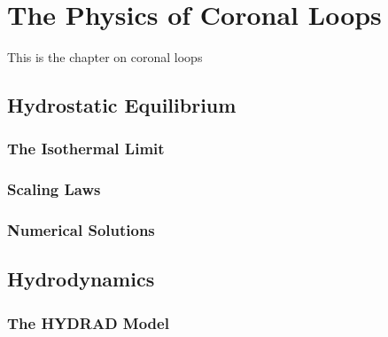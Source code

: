\chapter{The Physics of Coronal Loops}\label{ch:loops}



This is the chapter on coronal loops

\section{Hydrostatic Equilibrium}



\subsection{The Isothermal Limit}

\subsection{Scaling Laws}\label{sec:scaling_laws}


\subsection{Numerical Solutions}


\section{Hydrodynamics}


\subsection{The HYDRAD Model}

